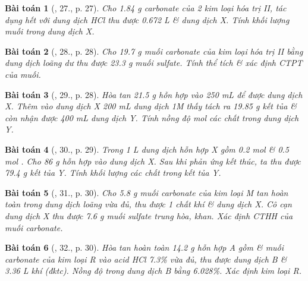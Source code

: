 \documentclass{article}
\newtheorem{baitoan}{Bài toán}
\begin{document}
\begin{baitoan}[\cite{An_350_BT_Hoa_Hoc_9}, 27., p. 27]
	Cho \emph{1.84 g} carbonate của 2 kim loại hóa trị II, tác dụng hết với dung dịch \emph{HCl} thu được \emph{0.672 L } \& dung dịch X. Tính khối lượng muối trong dung dịch X.
\end{baitoan}

\begin{baitoan}[\cite{An_350_BT_Hoa_Hoc_9}, 28., p. 28]
	Cho \emph{19.7 g} muối carbonate của kim loại hóa trị II bằng dung dịch \emph{} loãng dư thu được \emph{23.3 g} muối sulfate. Tính thể tích \emph{} \& xác định CTPT của muối.
\end{baitoan}

\begin{baitoan}[\cite{An_350_BT_Hoa_Hoc_9}, 29., p. 28]
	Hòa tan \emph{21.5 g} hỗn hợp \emph{} vào \emph{250 mL } để được dung dịch X. Thêm vào dung dịch X \emph{200 mL} dung dịch \emph{ 1M} thấy tách ra \emph{19.85 g} kết tủa \& còn nhận được \emph{400 mL} dung dịch Y. Tính nồng độ mol các chất trong dung dịch Y.
\end{baitoan}

\begin{baitoan}[\cite{An_350_BT_Hoa_Hoc_9}, 30., p. 29]
	Trong \emph{1 L} dung dịch hỗn hợp X gồm \emph{0.2 mol } \& \emph{0.5 mol }. Cho \emph{86 g} hỗn hợp \emph{} vào dung dịch X. Sau khi phản ứng kết thúc, ta thu được \emph{79.4 g} kết tủa Y. Tính khối lượng các chất trong kết tủa Y.
\end{baitoan}

\begin{baitoan}[\cite{An_350_BT_Hoa_Hoc_9}, 31., p. 30]
	Cho \emph{5.8 g} muối carbonate \emph{} của kim loại M tan hoàn toàn trong dung dịch \emph{} loãng vừa đủ, thu được 1 chất khí \& dung dịch X. Cô cạn dung dịch X thu được \emph{7.6 g} muối sulfate trung hòa, khan. Xác định CTHH của muối carbonate.
\end{baitoan}

\begin{baitoan}[\cite{An_350_BT_Hoa_Hoc_9}, 32., p. 30]
	Hòa tan hoàn toàn \emph{14.2 g} hỗn hợp A gồm \emph{} \& muối carbonate của kim loại R vào acid \emph{HCl 7.3\%} vừa đủ, thu được dung dịch B \& \emph{3.36 L} khí \emph{} (đktc). Nồng độ \emph{} trong dung dịch B bằng \emph{6.028\%}. Xác định kim loại R.
\end{baitoan}
\end{document}
